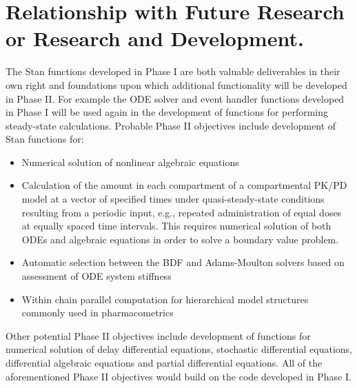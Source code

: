 \documentclass[11pt]{nih2016}
\begin{document}
\section{Relationship with Future Research or Research and
  Development.}





The Stan functions developed in Phase I are both valuable deliverables
in their own right and foundations upon which additional functionality
will be developed in Phase II. For example the ODE solver and event
handler functions developed in Phase I will be used again in the
development of functions for performing steady-state calculations.
Probable Phase II objectives include development of Stan functions
for:

\begin{itemize}
\item Numerical solution of nonlinear algebraic equations
\item Calculation of the amount in each compartment of a compartmental
  PK/PD model at a vector of specified times under quasi-steady-state
  conditions resulting from a periodic input, e.g., repeated
  administration of equal doses at equally spaced time intervals. This
  requires numerical solution of both ODEs and algebraic equations in
  order to solve a boundary value problem.
\item Automatic selection between the BDF and Adams-Moulton solvers
  based on assessment of ODE system stiffness
\item Within chain parallel computation for hierarchical model
  structures commonly used in pharmacometrics
\end{itemize}

Other potential Phase II objectives include development of functions
for numerical solution of delay differential equations, stochastic
differential equations, differential algebraic equations and partial
differential equations. All of the aforementioned Phase II objectives
would build on the code developed in Phase I.
\end{document}
